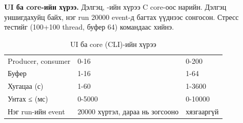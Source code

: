\documentclass[12pt,a4paper]{article}
\begin{document}

\textbf{UI ба core-ийн хүрээ.} Дэлгэц, -ийн хүрээ C core-оос нарийн. Дэлгэц уншигдахуйц байх, нэг run 20000 event-д багтах үүднээс сонгосон. Стресс тестийг (100+100 thread, буфер 64) командаас хийнэ.
\begin{table}[H]\centering\small
\caption{UI ба core (CLI)-ийн хүрээ}\label{tab:limits}
\begin{tabular}{|L{0.3\textwidth}|L{0.35\textwidth}|L{0.35\textwidth}|}\hline
{} &  &  \\\hline
Producer, consumer & 0-16 & 0-200 \\\hline
Буфер & 1-16 & 1-64 \\\hline
Хугацаа (с) & 1-60 & 1-3600 \\\hline
Унтах ≤ (мс) & 0-5000 & 0-10000 \\\hline
Нэг run-ийн event & 20000 хүртэл, дараа нь зогсооно & хязгааргүй \\\hline
\end{tabular}
\end{table}
\end{document}
